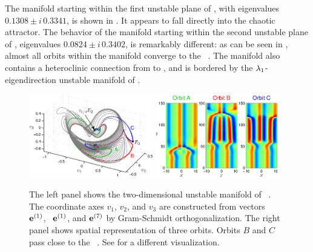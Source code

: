 The manifold starting within the first unstable plane of , with
eigenvalues $0.1308\pm i\,0.3341$, is shown in
. It appears to fall directly into the
chaotic attractor.  The behavior of the manifold starting within
the second unstable plane of , eigenvalues $0.0824\pm i \, 0.3402$, is
remarkably different: as can be seen in ,
almost all orbits within the manifold converge to the \eqv\ .  The
manifold also contains a heteroclinic connection from  to ,
and is bordered by the $\eigExp[1]$-eigendirection
unstable manifold of .

\begin{figure}[ht]
\begin{center}
\includegraphics[width=0.48\textwidth, clip=true]{figs/ks22_E2_manifold_c.eps}
\includegraphics[width=0.48\textwidth, clip=true]{figs/ks22_E2_orbits_c.eps}
\end{center}
\caption{
The left panel shows the two-dimensional
unstable manifold of \eqv\ . The coordinate axes
$v_1$, $v_2$, and $v_3$ are constructed from vectors
\Re\, $\jEigvec{1}$, \Im\, $\jEigvec{1}$, and \edit{\Re\,} $\jEigvec{7}$
by Gram-Schmidt orthogonalization.
The right panel shows spatial representation of three orbits. Orbits
$B$ and $C$ pass close to the \eqv\ . See
 for a different visualization.
       }
\label{f:KS22E2man}
\end{figure}


